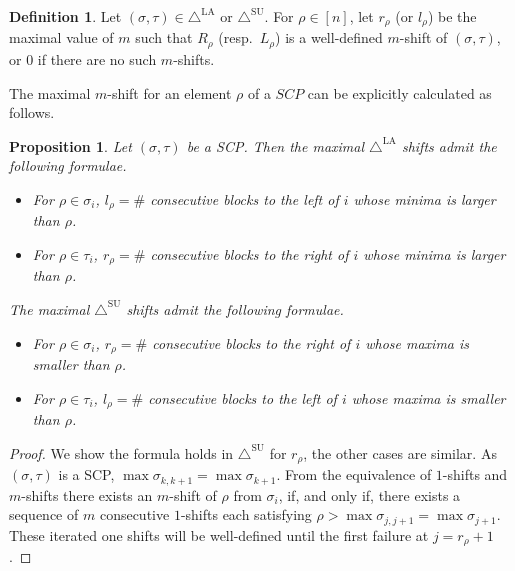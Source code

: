 \documentclass{amsart}
\newtheorem{proposition}[theorem]{Proposition}
\theoremstyle{definition}
\newtheorem{definition}[theorem]{Definition}
\newcommand{\SUD}{\triangle^{\mathrm{SU}}}
\newcommand{\LAD}{\triangle^{\mathrm{LA}}}
\begin{document}
\begin{definition}
Let $(\sigma,\tau) \in \LAD$ or $\SUD$. For $\rho \in [n]$, let $r_\rho$ (or $l_\rho$) be the maximal value of $m$ such that $R_\rho$ (resp.~$L_\rho$) is a well-defined $m$-shift of $(\sigma,\tau)$, or $0$ if there are no such $m$-shifts.

\end{definition}

The maximal $m$-shift for an element $\rho$ of a $SCP$ can be explicitly calculated as follows. 

\begin{proposition}\label{prop:maximal m-shift formulae}
Let $(\sigma,\tau)$ be a SCP. Then the  maximal $\LAD$ shifts admit the following formulae.
\begin{itemize}
    \item For $\rho \in \sigma_i$, $l_\rho = \# $ consecutive blocks to the left of $i$ whose minima is larger than $\rho$.
    \item For $\rho \in \tau_i$, $r_\rho = \# $ consecutive blocks to the right of $i$ whose minima is larger than $\rho$.
\end{itemize}
The maximal $\SUD$ shifts admit the following formulae.
\begin{itemize}
    \item For $\rho \in \sigma_i$, $r_\rho = \# $ consecutive blocks to the right of $i$ whose maxima is smaller than $\rho$.
    \item For $\rho \in \tau_i$, $l_\rho = \# $ consecutive blocks to the left of $i$ whose maxima is smaller than $\rho$.
\end{itemize}
\end{proposition}

\begin{proof}
We show the formula holds in $\SUD$ for $r_\rho$, the other cases are similar. 
As $(\sigma,\tau)$ is a SCP, $\max \sigma_{k,k+1} = \max \sigma_{k+1}$. 
From the equivalence of $1$-shifts and $m$-shifts there exists an $m$-shift of $\rho$ from $\sigma_i$, if, and only if, there exists a sequence of $m$ consecutive $1$-shifts each satisfying $\rho > \max \sigma_{j,j+1}=\max \sigma_{j+1}$.
These iterated one shifts will be well-defined until the first failure at $j=r_\rho+1$.
\end{proof}
\end{document}

